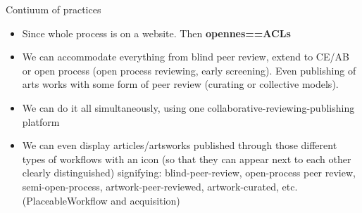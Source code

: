 \begin{frame}{Contiuum of practices}
 
\begin{itemize}
\item Since whole process is on a website. Then {\bf opennes==ACLs}

\item We can accommodate everything from blind peer review, extend to CE/AB or open process (open process reviewing, early screening). 
Even publishing of arts works with some form of peer review (curating or collective models).

\item We can do it all simultaneously, using one collaborative-reviewing-publishing platform

\item We can even display articles/artsworks published through those different types of workflows with an icon (so that they can appear next to each other clearly distinguished) signifying: blind-peer-review, open-process peer review, semi-open-process, artwork-peer-reviewed, artwork-curated, etc. (PlaceableWorkflow and acquisition)
\end{itemize}
\end{frame}

